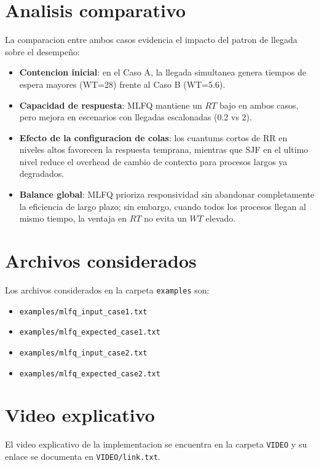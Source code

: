 \documentclass[12pt,a4paper]{article}
\begin{document}
\section{Analisis comparativo}

La comparacion entre ambos casos evidencia el impacto del patron de llegada sobre el desempeño:
\begin{itemize}[leftmargin=1.5cm]
    \item \textbf{Contencion inicial}: en el Caso A, la llegada simultanea genera tiempos de espera mayores (WT=28) frente al Caso B (WT=5.6).
    \item \textbf{Capacidad de respuesta}: MLFQ mantiene un \(RT\) bajo en ambos casos, pero mejora en escenarios con llegadas escalonadas (0.2 vs 2).
    \item \textbf{Efecto de la configuracion de colas}: los cuantums cortos de RR en niveles altos favorecen la respuesta temprana, mientras que SJF en el ultimo nivel reduce el overhead de cambio de contexto para procesos largos ya degradados.
    \item \textbf{Balance global}: MLFQ prioriza responsividad sin abandonar completamente la eficiencia de largo plazo; sin embargo, cuando todos los procesos llegan al mismo tiempo, la ventaja en \(RT\) no evita un \(WT\) elevado.
\end{itemize}

\section{Archivos considerados}

Los archivos considerados en la carpeta \texttt{examples} son:
\begin{itemize}[leftmargin=1.5cm]
    \item \texttt{examples/mlfq\_input\_case1.txt}
    \item \texttt{examples/mlfq\_expected\_case1.txt}
    \item \texttt{examples/mlfq\_input\_case2.txt}
    \item \texttt{examples/mlfq\_expected\_case2.txt}
\end{itemize}

\section{Video explicativo}

El video explicativo de la implementacion se encuentra en la carpeta \texttt{VIDEO} y su enlace se documenta en \texttt{VIDEO/link.txt}.
\end{document}
